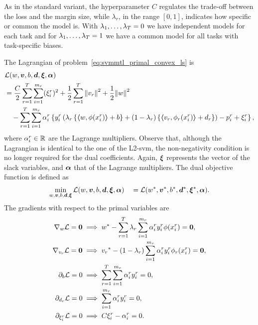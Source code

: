 As in the standard variant, the hyperparameter $C$ regulates the trade-off between the loss and the margin size, while $\lambda_r$, in the range $[0, 1]$, indicates how specific or common the model is. With $\lambda_1, \ldots, \lambda_T=0$ we have independent models for each task and for $\lambda_1, \ldots, \lambda_T=1$ we have a common model for all tasks with task-specific biases. 
 


The Lagrangian of problem~\eqref{eq:svmmtl_primal_convex_ls} is
\begin{equation}\label{eq:svmmtl_lagrangian_convex_ls}
    \begin{aligned}
        & \lagr({w}, \fv{v}, b, \fv{d}, \fv{\xi}, \fv{\alpha}) \\
        &=  \frac{C}{2} \sum_{r= 1}^T \sum_{i=1}^{m_r} ({\xi_{i}^r})^2 + \frac{1}{2} \sum_{r= 1}^T{\norm{{v}_r}^2} + \frac{1}{2} {\norm{{w}}}^2 \\
        &\quad -  \sum_{r= 1}^T \sum_{i=1}^{m_r} \alpha_i^r \left\lbrace y_{i}^r  \left(\lambda_r \left\lbrace \dotp{w}{\phi(x_{i}^r)} + b  \right\rbrace + (1 - \lambda_r) \left\lbrace \dotp{{v}_r}{\phi_r(x_{i}^r)} + d_r \right\rbrace  \right) - p_{i}^r + \xi_{i}^r  \right\rbrace ,
    \end{aligned}
\end{equation}
where $\alpha_i^r \in \mathbb{R}$ are the Lagrange multipliers. Observe that, although the Lagrangian is identical to the one of the L2-\acrshort{svm}, the non-negativity condition is no longer required for the dual coefficients.  Again, $\bm{\xi}$ represents the vector of the slack variables, and $\bm{\alpha}$ that of the Lagrange multipliers.
The dual objective function is defined as 
\begin{equation}\nonumber
    \begin{aligned}
          \min_{{w}, \bm{v}, b, \bm{d}, \bm{\xi}} \mathcal{L}({w}, \bm{v}, b, \bm{d}, \bm{\xi}, \bm{\alpha})
         \quad = \mathcal{L}({{w}}^*, {\bm{v}}^*, {b}^*, {\bm{d}}^*, {\bm{\xi}}^*, \bm{\alpha}) .
    \end{aligned}    
\end{equation}
The gradients with respect to the primal variables are
\begin{align}
    \grad_{{w}} \lagr = \fv{0}  &\implies \optim{{w}} - \sum_{r= 1}^\ntasks \lambda_r \sum_{i=1}^{m_r} {\alpha_i^r} y_i^r \phi(x_i^r) = \fv{0} , \label{eq:common_repr_conv_ls} \\
    \grad_{{v}_r} \lagr = \fv{0} &\implies \optim{{v}_r} - (1 - \lambda_r) \sum_{i=1}^{m_r} {\alpha_i^r} y_i^r \phi_r(x_i^r) = \fv{0} , \label{eq:specific_repr_conv_ls} \\
    \partial_{b} \lagr = 0  &\implies \sum_{r= 1}^T \sum_{i=1}^{m_r} {\alpha_i^r} y_i^r = 0 , \label{eq:specific_eqconstr_conv_ls}  \\
    \partial_{{d}_r} \lagr = 0 &\implies \sum_{i=1}^{m_r} {\alpha_i^r} y_i^r = 0 , \label{eq:common_eqconstr_conv_ls} \\
    \partial_{\xi_i^r} \lagr = 0 &\implies C \xi_i^r - {\alpha_i^r} = 0 . \label{eq:xi_feas_conv_ls}
\end{align}
